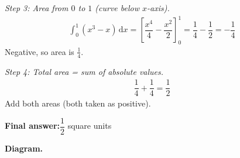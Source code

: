 \documentclass[11pt]{article}
\begin{document}
\textit{Step 3: Area from \( 0 \) to \( 1 \) (curve below \( x \)-axis).}
\[\begin{gathered}
\int_{0}^{1}(x^3 - x)\, \mathrm{d}x = \left[\dfrac{x^4}{4} - \dfrac{x^2}{2}\right]_0^1 = \dfrac{1}{4} - \dfrac{1}{2} = -\dfrac{1}{4}
\end{gathered}\]
Negative, so area is \( \tfrac{1}{4} \).

\textit{Step 4: Total area = sum of absolute values.}
\[\begin{gathered}
\dfrac{1}{4} + \dfrac{1}{4} = \dfrac{1}{2}
\end{gathered}\]
Add both areas (both taken as positive).

\begin{answerbox}
\textbf{Final answer:}\quad \(\displaystyle \dfrac{1}{2}\) square units
\end{answerbox}
\textbf{Diagram.}
\end{document}
